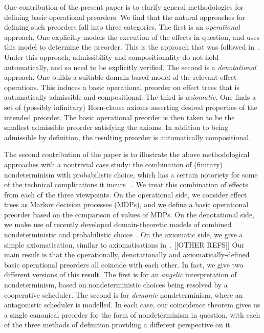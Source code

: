 One contribution of the present paper is to clarify general methodologies for defining basic operational preorders. 
We find that the natural approaches for defining such preorders fall into three categories. The first is an \emph{operational} approach. One explicitly models the execution of the effects in question, and uses this model to determine the preorder. This is the approach that was followed 
in~\cite{gom}. Under this approach, admissibility and compositionality do not hold automatically, and so need to be explicitly verified. The second is a  \emph{denotational} approach. One builds a suitable domain-based model of the relevant effect operations. This induces a basic operational preorder on  effect trees that is automatically admissible and compositional. 
The third is \emph{axiomatic}. One finds a set of (possibly infinitary) Horn-clause axioms asserting desired properties of the intended preorder. The basic operational preorder is then taken to be the smallest admissible preorder satisfying the axioms. In addition to being admissible by definition, the resulting preorder is automatically compositional. 

The second contribution of the paper is to illustrate the above methodological approaches
with a nontrivial case study: the combination of (finitary) nondeterminism with probabilistic choice, which has a certain notoriety 
for some of the technical complications it incurs ~\cite{Mislove2000,mislove2004axioms,VW06,tix2009semantic,JGL15,JGL-mscs16,KeimelP2016}.
We treat this combination of effects from each of the three viewpoints. 
On the operational side, we consider effect trees as Markov decision processes (MDPs), and we define a basic operational preorder based on the comparison of values of MDPs. On the denotational side, we make use of recently developed domain-theoretic models of combined nondeterministic and probabilistic choice~\cite{tix2009semantic,JGL-mscs16,KeimelP2016}.
On the axiomatic side, we give a simple axiomatisation, similar to axiomatisations in~\cite{KeimelP2016}. [[OTHER REFS]]
Our main result is that the
operationally, denotationally and axiomatically-defined basic operational preorders all coincide with each other.
In fact, we give two different versions of this result. 
The first is for an \emph{angelic} interpretation of nondeterminism, based on nondeterministic choices being resolved by a cooperative scheduler. The second is for \emph{demonic} nondeterminism, where an antagonistic scheduler is modelled. 
In each case, our coincidence theorem gives us a single canonical preorder for the form of nondeterminism in question, with each of the three methods of definition providing a different perspective on it. 

